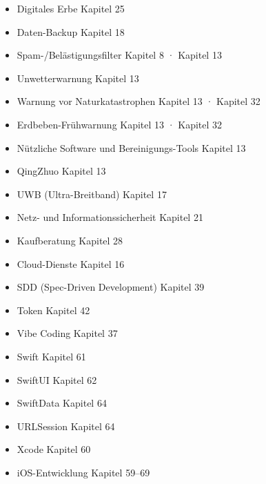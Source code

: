 \begin{itemize}
  \item Digitales Erbe Kapitel 25
  \item Daten-Backup Kapitel 18
  \item Spam-/Belästigungsfilter Kapitel 8 · Kapitel 13
  \item Unwetterwarnung Kapitel 13
  \item Warnung vor Naturkatastrophen Kapitel 13 · Kapitel 32
  \item Erdbeben-Frühwarnung Kapitel 13 · Kapitel 32
  \item Nützliche Software und Bereinigungs-Tools Kapitel 13
  \item QingZhuo Kapitel 13
  \item UWB (Ultra-Breitband) Kapitel 17
  \item Netz- und Informationssicherheit Kapitel 21
  \item Kaufberatung Kapitel 28
  \item Cloud-Dienste Kapitel 16
  \item SDD (Spec-Driven Development) Kapitel 39
  \item Token Kapitel 42
  \item Vibe Coding Kapitel 37
  \item Swift Kapitel 61
  \item SwiftUI Kapitel 62
  \item SwiftData Kapitel 64
  \item URLSession Kapitel 64
  \item Xcode Kapitel 60
  \item iOS-Entwicklung Kapitel 59–69
\end{itemize}


